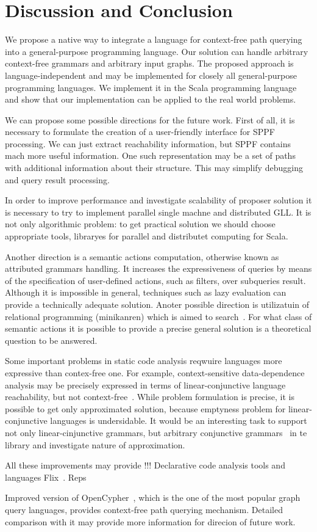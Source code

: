 \section{Discussion and Conclusion}

We propose a native way to integrate a language for context-free path querying into a general-purpose programming language.
Our solution can handle arbitrary context-free grammars and arbitrary input graphs.
The proposed approach is language-independent and may be implemented for closely all general-purpose programming languages.
We implement it in the Scala programming language and show that our implementation can be applied to the real world problems.

We can propose some possible directions for the future work.
First of all, it is necessary to formulate the creation of a user-friendly interface for SPPF processing.
We can just extract reachability information, but SPPF contains mach more useful information.
One such representation may be a set of paths with additional information about their structure.
This may simplify debugging and query result processing.

In order to improve performance and investigate scalability of proposer solution it is necessary to try to implement parallel single machne and distributed GLL.
It is not only algorithmic problem: to get practical solution we should choose appropriate tools, libraryes for parallel and distributet computing for Scala.

Another direction is a semantic actions computation, otherwise known as attributed grammars handling.
It increases the expressiveness of queries by means of the specification of user-defined actions, such as filters, over subqueries result. 
Although it is impossible in general, techniques such as lazy evaluation can provide a technically adequate solution.
Anoter possible direction is utilizatuin of relational programming (minikanren) which is aimed to search~\cite{DB}.
For what class of semantic actions it is possible to provide a precise general solution is a theoretical question to be answered. 

Some important problems in static code analysis reqwuire languages more expressive than contex-free one.
For example, context-sensitive data-dependence analysis may be precisely expressed in terms of linear-conjunctive language~\cite{Okhotin2003LCL} reachability, but not context-free~\cite{LCLReachability}.
While problem formulation is precise, it is possible to get only approximated solution, because emptyness problem for linear-conjunctive languages is undersidable.
It would be an interesting task to support not only linear-cinjunctive grammars, but arbitrary conjunctive grammars~\cite{okhotin2001conjunctive} in te library and investigate nature of approximation.

All these improvements may provide !!! Declarative code analysis tools and languages Flix~\cite{Flix}. Reps~\cite{Reps:1995}

Improved version of OpenCypher~\cite{OpenCypherPR}, which is the one of the most popular graph query languages, provides context-free path querying mechanism.
Detailed comparison with it may provide more information for direcion of future work.

